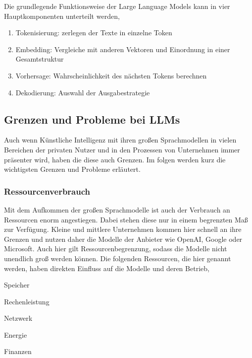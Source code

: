 Die grundlegende Funktionsweise der Large Language Models kann in vier Hauptkomponenten unterteilt werden,

\begin{enumerate}
	\item Tokenisierung: zerlegen der Texte in einzelne Token
	\item Embedding: Vergleiche mit anderen Vektoren und Einordnung in einer Gesamtstruktur
	\item Vorhersage: Wahrscheinlichkeit des nächsten Tokens berechnen
	\item Dekodierung: Auswahl der Ausgabestrategie
\end{enumerate}


\subsection{Grenzen und Probleme bei LLMs}
Auch wenn Künstliche Intelligenz mit ihren großen Sprachmodellen in vielen Bereichen der privaten Nutzer und in den Prozessen von Unternehmen immer präsenter wird, haben die diese auch Grenzen. Im folgen werden kurz die wichtigsten Grenzen und Probleme erläutert.



\subsubsection{Ressourcenverbrauch}
Mit  dem Aufkommen der großen Sprachmodelle ist auch der Verbrauch an Ressourcen enorm angestiegen. Dabei stehen diese nur in einem begrenzten Maß zur Verfügung. Kleine und mittlere Unternehmen kommen hier schnell an ihre Grenzen und nutzen daher die Modelle der Anbieter wie OpenAI, Google oder Microsoft. Auch hier gilt Ressourcenbegrenzung, sodass die Modelle nicht unendlich groß werden können. Die folgenden Ressourcen, die hier genannt werden, haben direkten Einfluss auf die Modelle und deren Betrieb,

\begin{myitemize}
	\item Speicher
	\item Rechenleistung
	\item Netzwerk
	\item Energie
	\item Finanzen
\end{myitemize}

